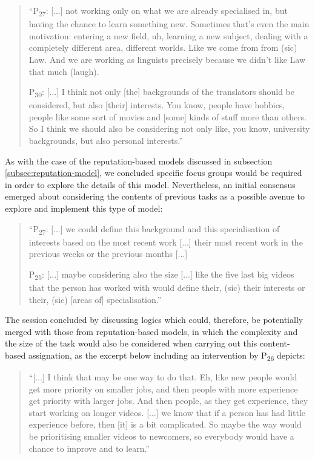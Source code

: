 \begin{quote}
     ``P\textsubscript{27}: [...] not working only on what we are already specialised in, but having the chance to learn something new. Sometimes that's  even the main motivation: entering a new field, uh, learning a new subject, dealing with a completely different area, different worlds. Like we come from from (sic) Law. And we are working as linguists precisely because we didn't like Law that much (laugh).
     
     P\textsubscript{30}: [...] I think not only [the] backgrounds of the translators should be considered, but also [their] interests. You know, people have hobbies, people like some sort of movies and [some] kinds of stuff more than others. So I think we should also be considering not only like, you know, university backgrounds, but also personal interests.''
\end{quote}
 
As with the case of the reputation-based models discussed in subsection \ref{subsec:reputation-model}, we concluded specific focus groups would be required in order to explore the details of this model. Nevertheless, an initial consensus emerged about considering the contents of previous tasks as a possible avenue to explore and implement this type of model:

\begin{quote}
     ``P\textsubscript{27}: [...] we could define this background and this specialisation of interests based on the most recent work [...] their most recent work in the previous weeks or the previous months [...]
     
     P\textsubscript{25}: [...] maybe considering also the size [...] like the five last big videos that the person has worked with would define their, (sic) their interests or their, (sic) [areas of] specialisation.''
\end{quote}

The session concluded by discussing logics which could, therefore, be potentially merged with those from reputation-based models, in which the complexity and the size of the task would also be considered when carrying out this content-based assignation, as the excerpt below including an intervention by P\textsubscript{26} depicts:

\begin{quote}
    ``[...] I think that may be one way to do that. Eh, like new people would get more priority on smaller jobs, and then people with more experience get priority with larger jobs. And then people, as they get experience, they start working on longer videos. [...] we know that if a person has had little experience before, then [it] is a bit complicated. So maybe the way would be prioritising smaller videos to newcomers, so everybody would have a chance to improve and to learn.''
\end{quote}

